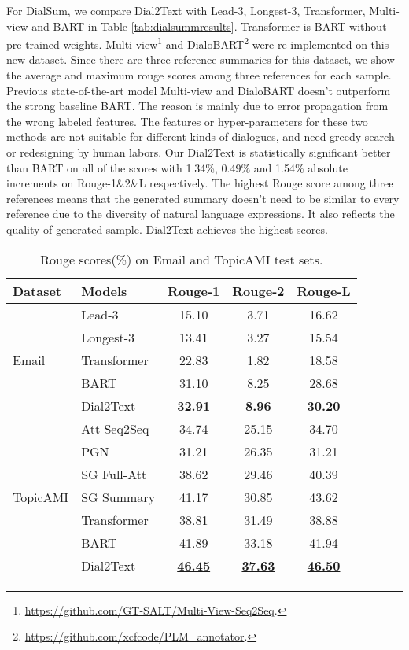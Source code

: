 For DialSum, we compare Dial2Text with Lead-3, Longest-3, Transformer, Multi-view and BART in Table \ref{tab:dialsummresults}. Transformer is BART without pre-trained weights. Multi-view\footnote{\url{https://github.com/GT-SALT/Multi-View-Seq2Seq}.} and DialoBART\footnote{\url{https://github.com/xcfcode/PLM_annotator}.} were re-implemented on this new dataset. Since there are three reference summaries for this dataset, we show the average and maximum rouge scores among three references for each sample. Previous state-of-the-art model Multi-view and DialoBART doesn't outperform the strong baseline BART.
The reason is mainly due to error propagation from the wrong labeled features. %
The features or hyper-parameters for these two methods are not suitable for different kinds of dialogues, and need greedy search or redesigning by human labors. 
Our Dial2Text is statistically significant better than BART on all of the scores with 1.34\%, 0.49\% and 1.54\% absolute increments on Rouge-1\&2\&L respectively.  
The highest Rouge score among three references means that the generated summary doesn't need to be similar to every reference due to the diversity of natural language expressions. It also reflects the quality of generated sample. Dial2Text achieves the highest scores.


\begin{table}
	\small
	\centering
	\begin{tabular}{llccc}
		\toprule[1pt]
		\textbf{Dataset}&\textbf{Models} & \textbf{Rouge-1} & \textbf{Rouge-2} & \textbf{Rouge-L} \\
		\midrule[1pt]
		\multirow{5}{0.9pt}{Email}&{Lead-3} &15.10&3.71&16.62 \\
		&{Longest-3} &13.41 &3.27 &15.54  \\
		&{Transformer} &22.83 &1.82 &18.58 \\
		&{BART} &31.10 &8.25 &28.68  \\
		&{Dial2Text} &\underline{\textbf{32.91}} &\underline{\textbf{8.96}} &\underline{\textbf{30.20}} \\
		\midrule[1pt]
		\multirow{7}{0.9pt}{TopicAMI}&{Att Seq2Seq} &34.74& 25.15&34.70 \\
		&{PGN} &31.21 &26.35 &31.21  \\
		&{SG Full-Att} &38.62 &29.46 &40.39 \\
		&{SG Summary} &41.17 &30.85 &43.62 \\
		&{Transformer}&38.81 &31.49 &38.88 \\
		&{BART} &41.89 &33.18 &41.94  \\
		&{Dial2Text} &\underline{\textbf{46.45}} &\underline{\textbf{37.63}} &\underline{\textbf{46.50}} \\
		\bottomrule[1pt]
	\end{tabular}
	\caption{Rouge scores(\%) on Email and TopicAMI test sets.}
	\label{tab:emailresults}
\end{table}

